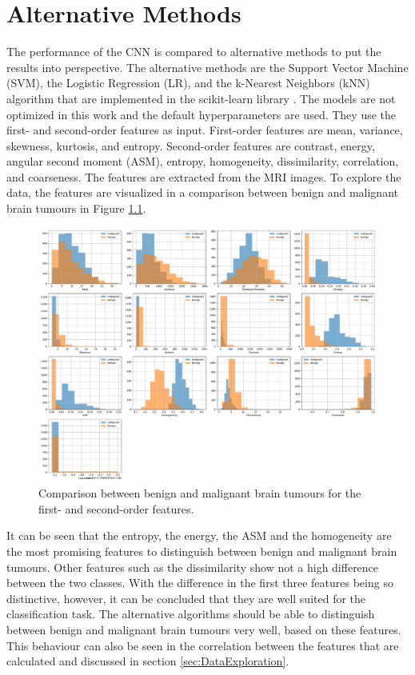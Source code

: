 \chapter{Alternative Methods}
\label{cha:alternative_methods}

The performance of the CNN is compared to alternative methods to put the results into perspective.
The alternative methods are the Support Vector Machine (SVM), the Logistic Regression (LR), and the k-Nearest Neighbors (kNN) algorithm that are implemented in the scikit-learn library \cite{scikit-learn}.
The models are not optimized in this work and the default hyperparameters are used.
They use the first- and second-order features as input.
First-order features are mean, variance, skewness, kurtosis, and entropy.
Second-order features are contrast, energy, angular second moment (ASM), entropy, homogeneity, dissimilarity, correlation, and coarseness.
The features are extracted from the MRI images. %
To explore the data, the features are visualized in a comparison between benign and malignant brain tumours in Figure \ref{fig:benign_malignant_comparison}.
\begin{figure}[H]
    \centering
    \includegraphics[width=.8\textwidth]{plots/benign_malignant_comparison.pdf}
    \caption{Comparison between benign and malignant brain tumours for the first- and second-order features.}
    \label{fig:benign_malignant_comparison}
\end{figure}
It can be seen that the entropy, the energy, the ASM and the homogeneity are the most promising features to distinguish between benign and malignant brain tumours.
Other features such as the dissimilarity show not a high difference between the two classes.
With the difference in the first three features being so distinctive, however, it can be concluded that they are well suited for the classification task.
The alternative algorithms should be able to distinguish between benign and malignant brain tumours very well, based on these features.
This behaviour can also be seen in the correlation between the features that are calculated and discussed in section \ref{sec:DataExploration}.

